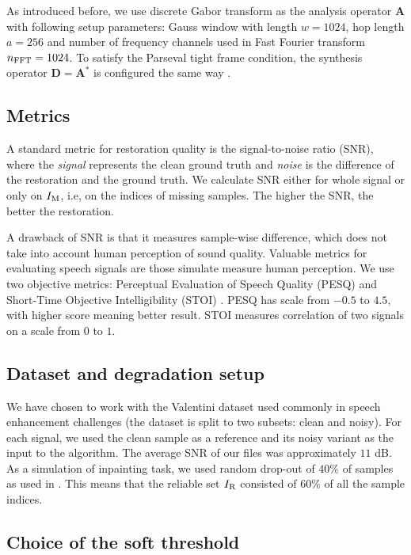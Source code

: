 \documentclass[conference]{IEEEtran}
\begin{document}
As introduced before, we use discrete Gabor transform as the analysis operator $\mathbf{A}$ with following setup parameters: Gauss window with length $w =1024 $, hop length $a = 256$ and number of frequency channels used in Fast Fourier transform 
$n_{\textup{FFT}} = 1024$.
To satisfy the Parseval tight frame condition, the synthesis operator $\mathbf{D} = \mathbf{A}^*$ is configured the same way \cite{Mokry2020}.

\subsection{Metrics}\label{subsec:metrics}


A standard metric for restoration quality is the signal-to-noise ratio (SNR), where the \textit{signal} represents the clean ground truth and \textit{noise} is the difference of the restoration and the ground truth.
We calculate SNR either for whole signal or only on $I_\textup{M}$, i.e, on the indices of missing samples.
The higher the SNR, the better the restoration.

A drawback of SNR is that it measures sample-wise difference, which does not take into account human perception of sound quality.
Valuable metrics for evaluating speech signals are those simulate measure human perception.
We use two objective metrics: Perceptual Evaluation of Speech Quality (PESQ) \cite{Rix2001} and 
Short-Time Objective Intelligibility (STOI) \cite{Taal2010}.
PESQ has scale from $-0.5$ to $4.5$, with higher score meaning better result.
STOI measures correlation of two signals on a scale from $0$ to $1$.

\subsection{Dataset and degradation setup}
We have chosen to work with the Valentini dataset \cite{ValentiniBotinhao2017} used commonly in speech enhancement challenges (the dataset is split to two subsets: clean and noisy).
For each signal, we used the clean sample as a reference and its noisy variant as the input to the algorithm.
The average SNR of our files was approximately $11$ dB.
As a simulation of inpainting task, we used random drop-out of $40\%$ of samples as used in \cite{Mokry2021}.
This means that the reliable set $I_\textup{R}$ consisted of $60\%$ of all the sample indices.

\subsection{Choice of the soft threshold}\label{subsec:soft_thresh}
\end{document}
